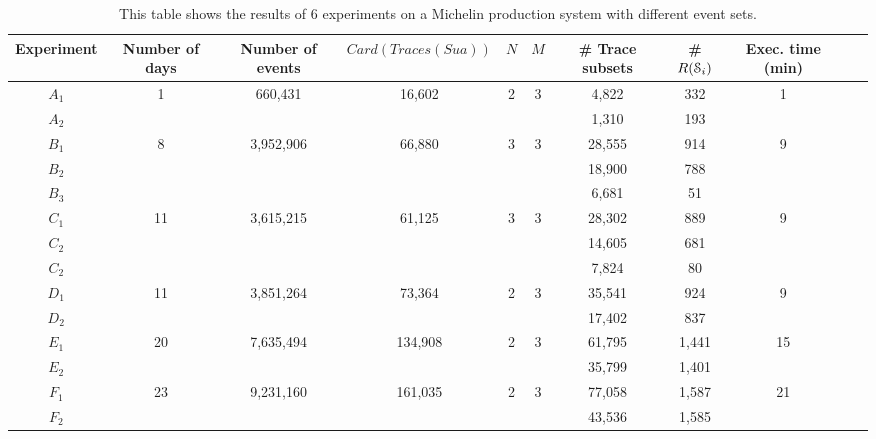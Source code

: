 \begin{table}
\begin{center}
\begin{tabular}{| c | c | c | c | c | c | c | c | c | c | c |}
\hline
Experiment & Number of days & Number of events &
$Card(Traces(Sua))$ & $N$ & $M$ & \# Trace subsets & \#
$R(\EuScript{S}_i)$ & Exec. time (min)\\
\hline
\hline
$A_1$ & 1     & 660,431   & 16,602  & 2 & 3 & 4,822  & 332   & 1 \\
$A_2$ &       &           &         &   &   & 1,310  & 193   &   \\
\hline
$B_1$ & 8     & 3,952,906 & 66,880  & 3 & 3 & 28,555 & 914   & 9 \\
$B_2$ &       &           &         &   &   & 18,900 & 788   &   \\
$B_3$ &       &           &         &   &   &  6,681 &  51   &   \\
\hline
$C_1$ & 11    & 3,615,215 & 61,125  & 3 & 3 & 28,302 & 889   & 9 \\
$C_2$ &       &           &         &   &   & 14,605 & 681   &   \\
$C_2$ &       &           &         &   &   &  7,824 &  80   &   \\
\hline
$D_1$ & 11    & 3,851,264 & 73,364  & 2 & 3 & 35,541 & 924   & 9 \\
$D_2$ &       &           &         &   &   & 17,402 & 837   &   \\
\hline
$E_1$ & 20    & 7,635,494 & 134,908 & 2 & 3 & 61,795 & 1,441 & 15 \\
$E_2$ &       &           &         &   &   & 35,799 & 1,401 &    \\
\hline
$F_1$ & 23    & 9,231,160 & 161,035 & 2 & 3 & 77,058 & 1,587 & 21 \\
$F_2$ &       &           &         &   &   & 43,536 & 1,585 &    \\
\hline
\end{tabular}
\end{center}

\caption{This table shows the results of 6 experiments on a
Michelin production system with different event sets.}
\label{fig:results}
\end{table}

